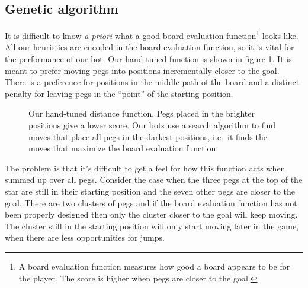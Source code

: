 \documentclass[a4paper,11pt]{article}
\begin{document}



\subsection{Genetic algorithm}
\label{genetic}

It is difficult to know \emph{a priori} what a good board evaluation
function\footnote{A board evaluation function measures how good a
  board appears to be for the player. The score is higher when pegs
  are closer to the goal.} looks like. All our heuristics are encoded
in the board evaluation function, so it is vital for the performance
of our bot. Our hand-tuned function is shown in figure
\ref{handtuned}. It is meant to prefer moving pegs into positions
incrementally closer to the goal. There is a preference for positions
in the middle path of the board and a distinct penalty for leaving
pegs in the ``point'' of the starting position.

\begin{figure}
\centering

\caption{Our hand-tuned distance function. Pegs placed in the brighter
  positions give a lower score. Our bots use a search algorithm to
  find moves that place all pegs in the darkest positions, i.e.~it
  finds the moves that maximize the board evaluation function.}
\label{handtuned}
\end{figure}

The problem is that it's difficult to get a feel for how this function
acts when summed up over all pegs. Consider the case when the three
pegs at the top of the star are still in their starting position and
the seven other pegs are closer to the goal. There are two clusters of
pegs and if the board evaluation function has not been properly
designed then only the cluster closer to the goal will keep moving.
The cluster still in the starting position will only start moving
later in the game, when there are less opportunities for jumps.
\end{document}
